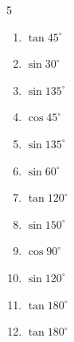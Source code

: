 \begin{multicols}{5}
\begin{enumerate}

\columnbreak %

  \item $\displaystyle \tan{45^\circ}$

        \phantom{$\displaystyle =1$}

  \item $\displaystyle \sin{30^\circ}$


  \item $\displaystyle \sin{135^\circ}$


  \item $\displaystyle \cos{45^\circ}$


  \item $\displaystyle \sin{135^\circ}$


  \item $\displaystyle \sin{60^\circ}$


  \item $\displaystyle \tan{120^\circ}$


  \item $\displaystyle \sin{150^\circ}$


  \item $\displaystyle \cos{90^\circ}$

        \phantom{$\displaystyle =0$}

  \item $\displaystyle \sin{120^\circ}$


  \item $\displaystyle \tan{180^\circ}$

        \phantom{$\displaystyle =0$}

  \item $\displaystyle \tan{180^\circ}$

        \phantom{$\displaystyle =0$}


\end{enumerate}
\end{multicols}
